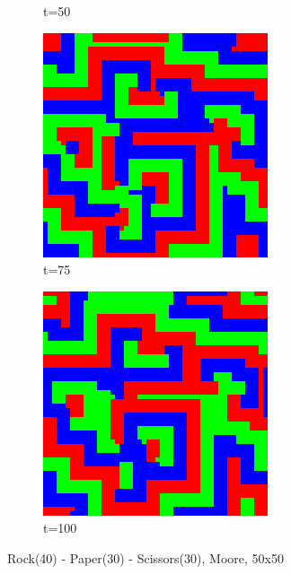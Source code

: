 \documentclass[a4paper, 11pt]{article}
\begin{document}
\begin{landscape}
\begin{figure}[H]
\begin{subfigure}{.20\textwidth}
  \caption{t=50}
\end{subfigure}%
\begin{subfigure}{.20\textwidth}
  \centering
  \includegraphics[width=0.95\linewidth]{ROCK_PAPER_SCISSORS_MOORE_50x50_HighRockPop_t75}
  \caption{t=75}
\end{subfigure}%
\begin{subfigure}{.20\textwidth}
  \centering
  \includegraphics[width=0.95\linewidth]{ROCK_PAPER_SCISSORS_MOORE_50x50_HighRockPop_t100}
  \caption{t=100}
\end{subfigure}
\caption{Rock(40) - Paper(30) - Scissors(30), Moore, 50x50}
\end{figure}



\end{landscape}
\end{document}
